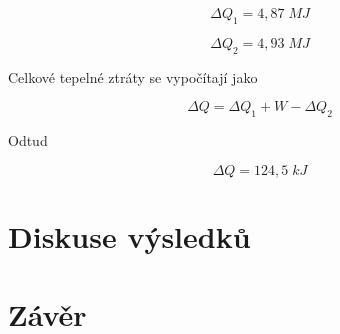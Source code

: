 \begin{equation}
    \nonumber
    \Delta Q_1 = 4,87 \; MJ
\end{equation}

\begin{equation}
    \nonumber
    \Delta Q_2 = 4,93 \; MJ
\end{equation}

Celkové tepelné ztráty se vypočítají jako

\begin{equation}
    \Delta Q = \Delta Q_1 + W - \Delta Q_2
\end{equation}

Odtud

\begin{equation}
    \Delta Q = 124,5 \; kJ
\end{equation}


\section{Diskuse výsledků}

\section{Závěr}
